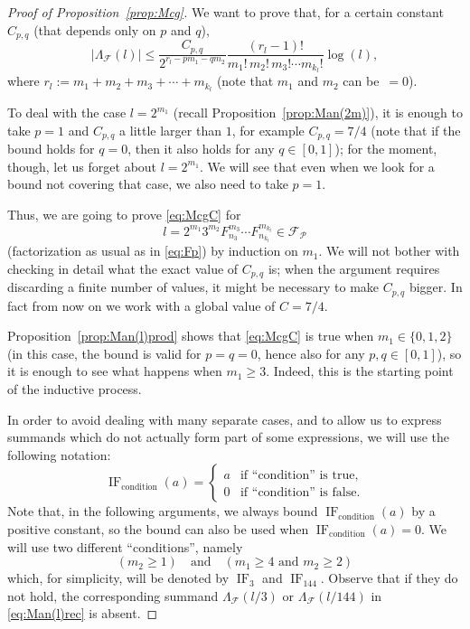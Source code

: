 \documentclass[11pt, a4paper]{article}
\newcommand{\manF}{\Lambda_{\mathcal{F}}}
\newcommand{\Fp}{\mathcal{F}_{\mathcal{P}}}
\newcommand{\IF}{\operatorname{IF}}
\theoremstyle{plain}
\theoremstyle{definition}
\begin{document}
\begin{proof}[Proof of Proposition~\ref{prop:Mcg}]
We want to prove that, for a certain constant $C_{p,q}$ (that depends only on $p$ and $q$), 
\begin{equation}
\label{eq:McgC}
|\manF(l)| \leq 
\frac{C_{p,q}}{2^{r_l-pm_1-qm_2}} \frac{(r_l-1)!}{m_1!\,m_2!\,m_3! \cdots m_{k_l}!} \log(l),
\end{equation}
where $r_{l} := m_1+m_2+m_3+ \cdots +m_{k_l}$ (note that $m_1$ and $m_2$ can be~$=0$).

To deal with the case $l=2^{m_1}$ (recall Proposition~\ref{prop:Man(2m)}), it is enough to take $p=1$ and $C_{p,q}$ a little larger than $1$, for example $C_{p,q}=7/4$ (note that if the bound holds for $q=0$, then it also holds for any $q\in[0,1]$);
for the moment, though, let us forget about $l=2^{m_1}$. We will see that even when we look for a bound not covering that case, we also need to take $p = 1$.

Thus, we are going to prove \eqref{eq:McgC} for 
\begin{equation*}
l = 2^{m_1}3^{m_2}F_{n_3}^{m_3} \cdots F_{n_{k_l}}^{m_{k_l}} \in \Fp
\end{equation*}
(factorization as usual as in \eqref{eq:Fp}) by induction on $m_1$. We will not bother with checking in detail what the exact value of $C_{p,q}$ is; when the argument requires discarding a finite number of values, it might be necessary to make $C_{p,q}$ bigger. In fact from now on we work with a global value of $C = 7/4$.

Proposition~\ref{prop:Man(l)prod} shows that \eqref{eq:McgC} is true when $m_1 \in \{0,1,2\}$ (in this case, the bound is valid for $p=q=0$, hence also for any $p,q\in[0,1]$), so it is enough to see what happens when $m_1 \ge 3$.
Indeed, this is the starting point of the inductive process.

In order to avoid dealing with many separate cases, and to allow us to express summands which do not actually form part of some expressions, we will use the following notation:
\[
  \IF_{\mathrm{condition}}(a) =
  \begin{cases}
  a & \text{if ``condition'' is true},\\
  0 & \text{if ``condition'' is false}.
  \end{cases}
\]
Note that, in the following arguments, we always bound $\IF_{\mathrm{condition}}(a)$ by a positive constant, so the bound can also be used when $\IF_{\mathrm{condition}}(a) = 0$. We will use two different ``conditions'', namely
\[
(m_2 \ge 1)  \quad\text{and}\quad (m_1 \ge 4 \text{ and } m_2 \ge 2)
\]
which, for simplicity, will be denoted by $\IF_3$ and $\IF_{144}$.
Observe that if they do not hold, the corresponding summand $\manF(l/3)$ or $\manF(l/144)$ in \eqref{eq:Man(l)rec} is absent. 


\end{proof}
\end{document}
